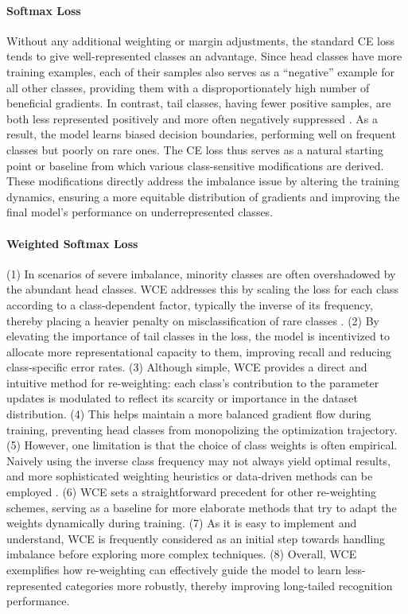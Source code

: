  \paragraph{Softmax Loss}
 Without any additional weighting or margin adjustments, the standard CE loss tends to give well-represented classes an advantage. Since head classes have more training examples, each of their samples also serves as a “negative” example for all other classes, providing them with a disproportionately high number of beneficial gradients. In contrast, tail classes, having fewer positive samples, are both less represented positively and more often negatively suppressed \cite{zhang2023deep, lin2018focallossdenseobject}. As a result, the model learns biased decision boundaries, performing well on frequent classes but poorly on rare ones. The CE loss thus serves as a natural starting point or baseline from which various class-sensitive modifications are derived. These modifications directly address the imbalance issue by altering the training dynamics, ensuring a more equitable distribution of gradients and improving the final model’s performance on underrepresented classes.

 \paragraph{Weighted Softmax Loss}
 (1) In scenarios of severe imbalance, minority classes are often overshadowed by the abundant head classes. WCE addresses this by scaling the loss for each class according to a class-dependent factor, typically the inverse of its frequency, thereby placing a heavier penalty on misclassification of rare classes \cite{zhang2023deep}.
(2) By elevating the importance of tail classes in the loss, the model is incentivized to allocate more representational capacity to them, improving recall and reducing class-specific error rates.
(3) Although simple, WCE provides a direct and intuitive method for re-weighting: each class’s contribution to the parameter updates is modulated to reflect its scarcity or importance in the dataset distribution.
(4) This helps maintain a more balanced gradient flow during training, preventing head classes from monopolizing the optimization trajectory.
(5) However, one limitation is that the choice of class weights is often empirical. Naively using the inverse class frequency may not always yield optimal results, and more sophisticated weighting heuristics or data-driven methods can be employed \cite{zhang2023deep}.
(6) WCE sets a straightforward precedent for other re-weighting schemes, serving as a baseline for more elaborate methods that try to adapt the weights dynamically during training.
(7) As it is easy to implement and understand, WCE is frequently considered as an initial step towards handling imbalance before exploring more complex techniques.
(8) Overall, WCE exemplifies how re-weighting can effectively guide the model to learn less-represented categories more robustly, thereby improving long-tailed recognition performance.


